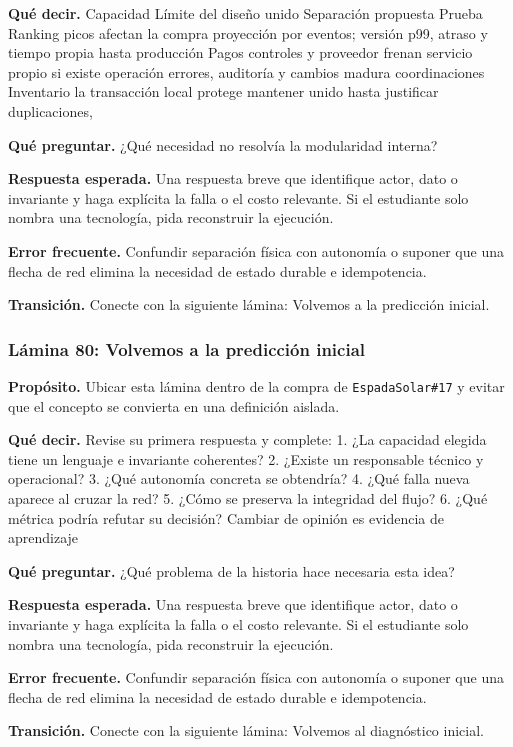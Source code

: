 \documentclass[variant=docente,cover=institutional,mode=screen]{ua-engineering-v6-article}
\begin{document}
\textbf{Qué decir.} Capacidad Límite del diseño unido Separación propuesta Prueba Ranking picos afectan la compra proyección por eventos; versión p99, atraso y tiempo propia hasta producción Pagos controles y proveedor frenan servicio propio si existe operación errores, auditoría y cambios madura coordinaciones Inventario la transacción local protege mantener unido hasta justificar duplicaciones, 

\textbf{Qué preguntar.} ¿Qué necesidad no resolvía la modularidad interna?

\textbf{Respuesta esperada.} Una respuesta breve que identifique actor, dato o invariante y haga explícita la falla o el costo relevante. Si el estudiante solo nombra una tecnología, pida reconstruir la ejecución.

\textbf{Error frecuente.} Confundir separación física con autonomía o suponer que una flecha de red elimina la necesidad de estado durable e idempotencia.

\textbf{Transición.} Conecte con la siguiente lámina: Volvemos a la predicción inicial.

\subsubsection*{Lámina 80: Volvemos a la predicción inicial}
\textbf{Propósito.} Ubicar esta lámina dentro de la compra de \texttt{EspadaSolar\#17} y evitar que el concepto se convierta en una definición aislada.

\textbf{Qué decir.} Revise su primera respuesta y complete: 1. ¿La capacidad elegida tiene un lenguaje e invariante coherentes? 2. ¿Existe un responsable técnico y operacional? 3. ¿Qué autonomía concreta se obtendría? 4. ¿Qué falla nueva aparece al cruzar la red? 5. ¿Cómo se preserva la integridad del flujo? 6. ¿Qué métrica podría refutar su decisión? Cambiar de opinión es evidencia de aprendizaje

\textbf{Qué preguntar.} ¿Qué problema de la historia hace necesaria esta idea?

\textbf{Respuesta esperada.} Una respuesta breve que identifique actor, dato o invariante y haga explícita la falla o el costo relevante. Si el estudiante solo nombra una tecnología, pida reconstruir la ejecución.

\textbf{Error frecuente.} Confundir separación física con autonomía o suponer que una flecha de red elimina la necesidad de estado durable e idempotencia.

\textbf{Transición.} Conecte con la siguiente lámina: Volvemos al diagnóstico inicial.
\end{document}
